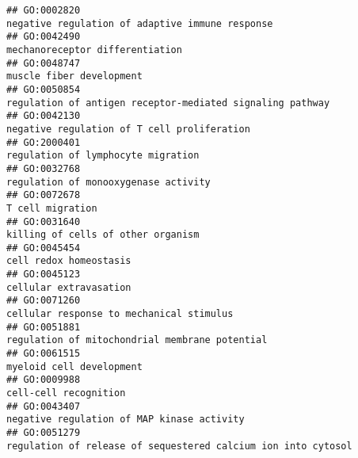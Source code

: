 \documentclass[
]{article}
\begin{document}
\begin{verbatim}
## GO:0002820                                                                                                  negative regulation of adaptive immune response
## GO:0042490                                                                                                                  mechanoreceptor differentiation
## GO:0048747                                                                                                                         muscle fiber development
## GO:0050854                                                                                        regulation of antigen receptor-mediated signaling pathway
## GO:0042130                                                                                                      negative regulation of T cell proliferation
## GO:2000401                                                                                                               regulation of lymphocyte migration
## GO:0032768                                                                                                             regulation of monooxygenase activity
## GO:0072678                                                                                                                                 T cell migration
## GO:0031640                                                                                                               killing of cells of other organism
## GO:0045454                                                                                                                           cell redox homeostasis
## GO:0045123                                                                                                                           cellular extravasation
## GO:0071260                                                                                                         cellular response to mechanical stimulus
## GO:0051881                                                                                                   regulation of mitochondrial membrane potential
## GO:0061515                                                                                                                         myeloid cell development
## GO:0009988                                                                                                                            cell-cell recognition
## GO:0043407                                                                                                       negative regulation of MAP kinase activity
## GO:0051279                                                                                    regulation of release of sequestered calcium ion into cytosol

\end{verbatim}
\end{document}
